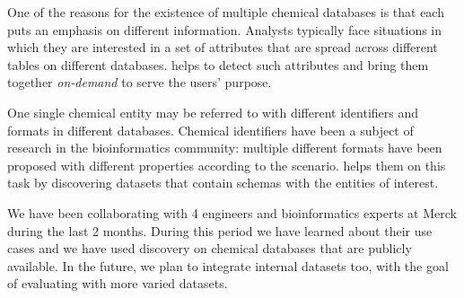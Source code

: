  One of the reasons for the existence of multiple chemical
databases is that each puts an emphasis on different information. Analysts
typically face situations in which they are interested in a set of attributes
that are spread across different tables on different databases. \dcv helps to
detect such attributes and bring them together \emph{on-demand}  to serve the
users' purpose.

 One single chemical entity may be referred to with
different identifiers and formats in different databases. Chemical identifiers
have been a subject of research in the bioinformatics community: multiple
different formats have been proposed with different properties according to the
scenario. \dcv helps them on this task by discovering datasets that contain
schemas with the entities of interest.

We have been collaborating with 4 engineers and bioinformatics experts at Merck
during the last 2 months. During this period we have learned about their use
cases and we have used discovery on chemical databases that are publicly
available. In the future, we plan to integrate internal datasets too, with the
goal of evaluating \dcv with more varied datasets.

